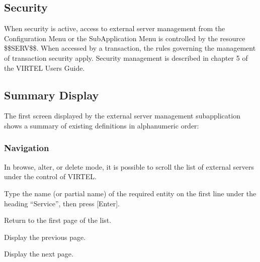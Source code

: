 \documentclass[letterpaper,10pt,english]{sphinxmanual}
\begin{document}
\subsection{Security}
\label{\detokenize{connectivity_guide:index-131}}\label{\detokenize{connectivity_guide:id67}}
\sphinxAtStartPar
When security is active, access to external server management from the Configuration Menu or the Sub\sphinxhyphen{}Application Menu is controlled by the resource \$\$SERV\$\$.
When accessed by a transaction, the rules governing the management of transaction security apply.
Security management is described in chapter 5 of the VIRTEL Users Guide.

\ignorespaces 

\subsection{Summary Display}
\label{\detokenize{connectivity_guide:index-132}}\label{\detokenize{connectivity_guide:id68}}
\sphinxAtStartPar
The first screen displayed by the external server management sub\sphinxhyphen{}application shows a summary of existing definitions in alphanumeric order:

\sphinxAtStartPar
{}


\subsubsection{Navigation}
\label{\detokenize{connectivity_guide:id69}}
\sphinxAtStartPar
In browse, alter, or delete mode, it is possible to scroll the list of external servers under the control of VIRTEL.
\begin{description}
\sphinxAtStartPar
Type the name (or partial name) of the required entity on the first line under the heading “Service”, then press {[}Enter{]}.

\sphinxlineitem{{[}PF6{]}}
\sphinxAtStartPar
Return to the first page of the list.

\sphinxlineitem{{[}PF7{]}}
\sphinxAtStartPar
Display the previous page.

\sphinxlineitem{{[}PF8{]}}
\sphinxAtStartPar
Display the next page.

\end{description}
\end{document}

